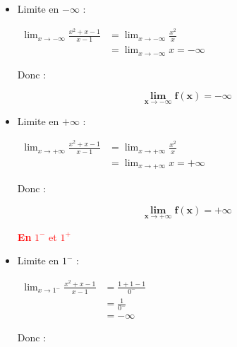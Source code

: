 \documentclass[12pt,a4paper]{article}
\begin{document}
\begin{enumerate}
\begin{itemize}
    \item Limite en \( -\infty \) :

\(
\begin{aligned}
    \lim_{x \to -\infty} \frac{x^2 + x - 1}{x - 1} &= \lim_{x \to -\infty} \frac{x^2}{x}\\
    &= \lim_{x \to -\infty} x = -\infty
\end{aligned}
\)

    Donc :
    
					\begin{resultbox}
            \[
                \mathbf{\lim_{x \to -\infty} f(x) = -\infty }
            \]
					\end{resultbox} 

    \item Limite en \( +\infty \) :

    \(
			\begin{aligned}
    	\lim_{x \to +\infty} \frac{x^2 + x - 1}{x - 1} &= \lim_{x \to +\infty} \frac{x^2}{x}\\
    	&= \lim_{x \to +\infty} x = +\infty
			\end{aligned}
		\)

		    Donc :
    
					\begin{resultbox}
            \[
                \mathbf{\lim_{x \to +\infty} f(x) = +\infty }
            \]
					\end{resultbox}

\textcolor{red}{\textbf{En} $1^-$ et $1^+$}

\begin{center}
\end{center}

    \item Limite en \( 1^- \) :

    \(
			\begin{aligned}
				\lim_{x \to 1^-} \frac{x^2 + x - 1}{x - 1} &= \frac{1 + 1 - 1}{0^-}\\ 
																									 &= \frac{1}{0^-}\\ 
																									 &= -\infty
			\end{aligned}
		\)

    Donc :
    

\end{itemize}
\end{enumerate}
\end{document}
